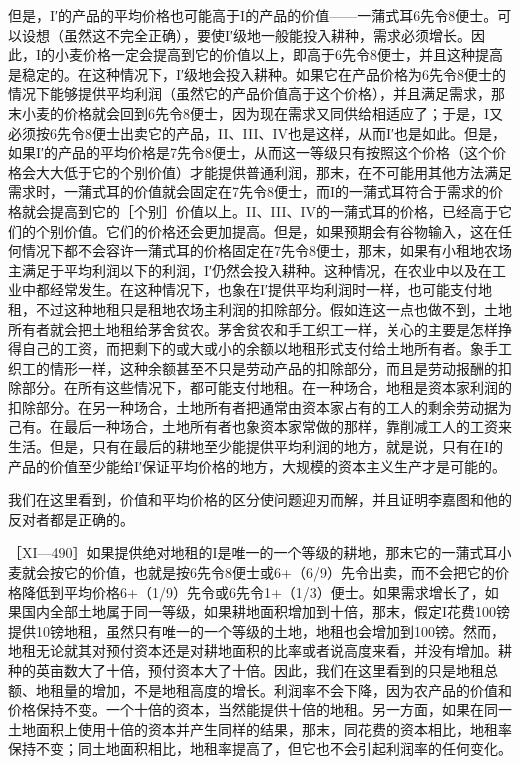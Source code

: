 但是，I′的产品的平均价格也可能高于I的产品的价值——一蒲式耳6先令8便士。可以设想（虽然这不完全正确），要使I′级地一般能投入耕种，需求必须增长。因此，I的小麦价格一定会提高到它的价值以上，即高于6先令8便士，并且这种提高是稳定的。在这种情况下，I′级地会投入耕种。如果它在产品价格为6先令8便士的情况下能够提供平均利润（虽然它的产品价值高于这个价格），并且满足需求，那末小麦的价格就会回到6先令8便士，因为现在需求又同供给相适应了；于是，I又必须按6先令8便士出卖它的产品，II、III、IV也是这样，从而I′也是如此。但是，如果I′的产品的平均价格是7先令8便士，从而这一等级只有按照这个价格（这个价格会大大低于它的个别价值）才能提供普通利润，那末，在不可能用其他方法满足需求时，一蒲式耳的价值就会固定在7先令8便士，而I的一蒲式耳符合于需求的价格就会提高到它的［个别］价值以上。II、III、IV的一蒲式耳的价格，已经高于它们的个别价值。它们的价格还会更加提高。但是，如果预期会有谷物输入，这在任何情况下都不会容许一蒲式耳的价格固定在7先令8便士，那末，如果有小租地农场主满足于平均利润以下的利润，I′仍然会投入耕种。这种情况，在农业中以及在工业中都经常发生。在这种情况下，也象在I′提供平均利润时一样，也可能支付地租，不过这种地租只是租地农场主利润的扣除部分。假如连这一点也做不到，土地所有者就会把土地租给茅舍贫农。茅舍贫农和手工织工一样，关心的主要是怎样挣得自己的工资，而把剩下的或大或小的余额以地租形式支付给土地所有者。象手工织工的情形一样，这种余额甚至不只是劳动产品的扣除部分，而且是劳动报酬的扣除部分。在所有这些情况下，都可能支付地租。在一种场合，地租是资本家利润的扣除部分。在另一种场合，土地所有者把通常由资本家占有的工人的剩余劳动据为己有。在最后一种场合，土地所有者也象资本家常做的那样，靠削减工人的工资来生活。但是，只有在最后的耕地至少能提供平均利润的地方，就是说，只有在I的产品的价值至少能给I′保证平均价格的地方，大规模的资本主义生产才是可能的。

我们在这里看到，价值和平均价格的区分使问题迎刃而解，并且证明李嘉图和他的反对者都是正确的。

［XI—490］如果提供绝对地租的I是唯一的一个等级的耕地，那末它的一蒲式耳小麦就会按它的价值，也就是按6先令8便士或6+（6/9）先令出卖，而不会把它的价格降低到平均价格6+（1/9）先令或6先令1+（1/3）便士。如果需求增长了，如果国内全部土地属于同一等级，如果耕地面积增加到十倍，那末，假定I花费100镑提供10镑地租，虽然只有唯一的一个等级的土地，地租也会增加到100镑。然而，地租无论就其对预付资本还是对耕地面积的比率或者说高度来看，并没有增加。耕种的英亩数大了十倍，预付资本大了十倍。因此，我们在这里看到的只是地租总额、地租量的增加，不是地租高度的增长。利润率不会下降，因为农产品的价值和价格保持不变。一个十倍的资本，当然能提供十倍的地租。另一方面，如果在同一土地面积上使用十倍的资本并产生同样的结果，那末，同花费的资本相比，地租率保持不变；同土地面积相比，地租率提高了，但它也不会引起利润率的任何变化。

